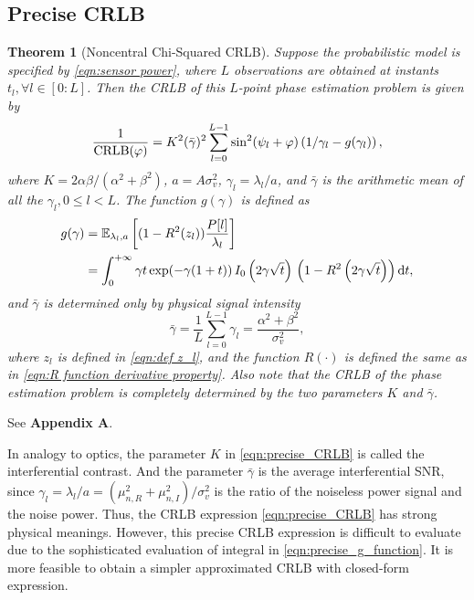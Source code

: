 \documentclass[12pt,draftclsnofoot,journal,onecolumn]{IEEEtran}
\newtheorem{theorem}{\bf Theorem}
\theoremstyle{nonumberplain}
\def \exp {\text{exp}}
\begin{document}
\subsection{Precise CRLB}
    \begin{theorem}[Noncentral Chi-Squared CRLB] \label{thm:precise CRLB}
        Suppose the probabilistic model is specified by \eqref{eqn:sensor power}, where $L$ observations are obtained at instants $t_l, \forall l\in[0:L]$. Then the CRLB of this $L$-point phase estimation problem is given by
        \begin{equation}
            \frac{1}{{\rm CRLB}(\varphi)} = K^2(\bar{\gamma})^2 \sum_{l=0}^{L-1}\sin^2(\psi_l+\varphi)\left(1/\gamma_l-g(\gamma_l)\right),
            \label{eqn:precise_CRLB}
        \end{equation}
        where $K=2\alpha\beta/(\alpha^2+\beta^2)$, $a=A\sigma_v^2$, $\gamma_l=\lambda_l/a$, and $\bar{\gamma}$ is the arithmetic mean of all the $\gamma_l, 0\leq l<L$. The function $g(\gamma)$ is defined as 
        \begin{equation}
            \begin{aligned}
                g(\gamma) &= \mathbb{E}_{\lambda_l, a}\left[(1-R^2(z_l))\frac{P[l]}{\lambda_l}\right] \\
                & = \int_{0}^{+\infty}\gamma t \, \exp(-\gamma(1+t))\, I_0\left(2\gamma\sqrt{t}\right)\,\left(1-R^2\left(2\gamma\sqrt{t}\right)\right){\rm d}t,
            \end{aligned}
            \label{eqn:precise_g_function}
        \end{equation}
        and $\bar{\gamma}$ is determined only by physical signal intensity
        \begin{equation}
            \bar{\gamma} = \frac{1}{L}\sum_{l=0}^{L-1}{\gamma_l} = \frac{\alpha^2+\beta^2}{\sigma_v^2},
        \end{equation}
        where $z_l$ is defined in \eqref{eqn:def z_l}, and the function $R(\cdot)$ is defined the same as in \eqref{eqn:R function derivative property}. Also note that the CRLB of the phase estimation problem is completely determined by the two parameters $K$ and $\bar{\gamma}$. 
    \end{theorem}
    \begin{IEEEproof}
        See {\bf Appendix A}. 
    \end{IEEEproof}
    In analogy to optics, the parameter $K$ in \eqref{eqn:precise_CRLB} is called the interferential contrast. And the parameter $\bar{\gamma}$ is the average interferential SNR, since $\gamma_l=\lambda_l/a = (\mu_{n,R}^2+\mu_{n,I}^2)/\sigma_v^2$ is the ratio of the noiseless power signal and the noise power. Thus, the CRLB expression \eqref{eqn:precise_CRLB} has strong physical meanings. However, this precise CRLB expression is difficult to evaluate due to the sophisticated evaluation of integral in \eqref{eqn:precise_g_function}. It is more feasible to obtain a simpler approximated CRLB with closed-form expression. 
\end{document}
